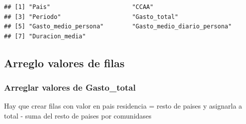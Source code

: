 \documentclass[notspecified,article,submit,moreauthors,pdftex]{Definitions/mdpi}
\newenvironment{Shaded}{\begin{snugshade}}{\end{snugshade}}
\newcommand{\CommentTok}[1]{\textcolor[rgb]{0.56,0.35,0.01}{\textit{#1}}}
\newcommand{\FunctionTok}[1]{\textcolor[rgb]{0.13,0.29,0.53}{\textbf{#1}}}
\newcommand{\NormalTok}[1]{#1}
\newcommand{\OtherTok}[1]{\textcolor[rgb]{0.56,0.35,0.01}{#1}}
\newcommand{\SpecialCharTok}[1]{\textcolor[rgb]{0.81,0.36,0.00}{\textbf{#1}}}
\newcommand{\StringTok}[1]{\textcolor[rgb]{0.31,0.60,0.02}{#1}}
\begin{document}
\begin{verbatim}
## [1] "Pais"                       "CCAA"                      
## [3] "Periodo"                    "Gasto_total"               
## [5] "Gasto_medio_persona"        "Gasto_medio_diario_persona"
## [7] "Duracion_media"
\end{verbatim}

\subsection{Arreglo valores de filas}\label{arreglo-valores-de-filas}

\begin{Shaded}
\end{Shaded}

\subsubsection{Arreglar valores de
Gasto\_total}\label{arreglar-valores-de-gasto_total}

Hay que crear filas con valor en pais residencia = resto de paises y
asignarla a total - suma del resto de paises por comunidases
\end{document}
